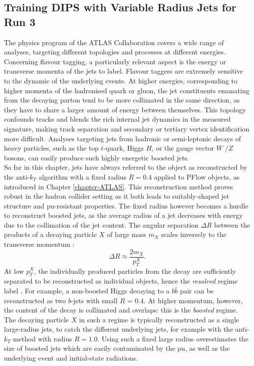 \subsection{Training DIPS with Variable Radius Jets for Run 3}\label{chapter:dipsVRtrain}
The physics program of the ATLAS Collaboration covers a wide range of analyses, targeting different topologies and processes at different energies. Concerning flavour tagging, a particularly relevant aspect is the energy or transverse momenta of the jets to label. Flavour taggers are extremely sensitive to the dynamic of the underlying events. At higher energies, corresponding to higher momenta of the hadronised quark or gluon, the jet constituents emanating from the decaying parton tend to be more collimated in the same direction, as they have to share a larger amount of energy between themselves. This topology confounds tracks and blends the rich internal jet dynamics in the measured signature, making track separation and secondary or tertiary vertex identification more difficult. Analyses targeting jets from hadronic or semi-leptonic decays of heavy particles, such as the top $t$-quark, Higgs $H$, or the gauge vector $W$ /$Z$ bosons, can easily produce such highly energetic boosted jets.  \\

So far in this chapter, jets have always referred to the object as reconstructed by the anti-$k_T$ algorithm with a fixed radius $R = 0.4$ applied to PFlow objects, as introduced in Chapter \ref{chapter-ATLAS}. This reconstruction method proves robust in the hadron collider setting as it both leads to suitably-shaped jet structure and \gls{pu}-resistant properties. The fixed radius however becomes a hurdle to reconstruct boosted jets, as the average radius of a jet decreases with energy due to the collimation of the jet content. The angular separation $\Delta R$ between the products of a decaying particle $X$ of large mass $m_X$ scales inversely to the transverse momentum \cite{ATLAS:largeRjet}: 
\begin{equation}\label{eq:sizeJet}
  \Delta R \approx \frac{2 m_X}{p_T^X}.
\end{equation}
At low $p_T^X$, the individually produced particles from the decay are sufficiently separated to be reconstructed as individual objects, hence the \textit{resolved} regime label \cite{ATLAS:2016hcf}. For example, a non-boosted Higgs decaying to a $b\bar{b}$ pair can be reconstructed as two $b$-jets with small $R$ = 0.4. At higher momentum, however, the content of the decay is collimated and overlaps: this is the \textit{boosted} regime. The decaying particle $X$ in such a regime is typically reconstructed as a single large-radius jets, to catch the different underlying jets, for example with the anti-$k_T$ method with radius $R = 1.0$. Using such a fixed large radius overestimates the size of boosted jets which are easily contaminated by the \gls{pu}, as well as the underlying event and initial-state radiations.  \\

